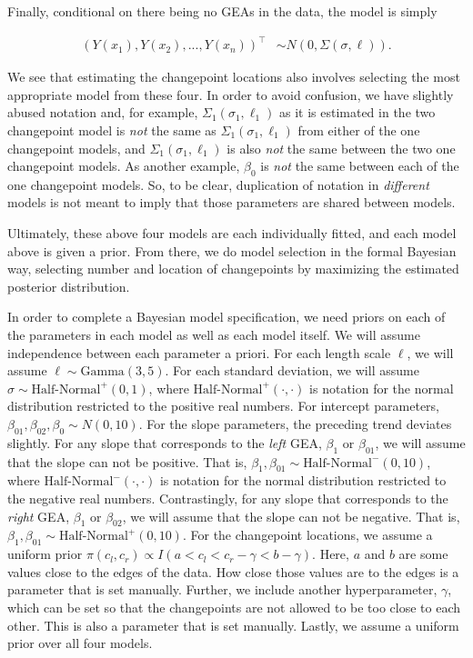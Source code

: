 \documentclass[12pt]{article}
\begin{document}
\noindent Finally, conditional on there being no GEAs in the data, the
model is simply

\begin{align}
(Y(x_{1}), Y(x_{2}), ..., Y(x_{n}))^{\top} &\sim N(0, \Sigma(\sigma, \ell)).
\end{align}

We see that estimating the changepoint locations also involves selecting
the most appropriate model from these four. In order to avoid confusion,
we have slightly abused notation and, for example,
\(\Sigma_1(\sigma_1, \ell_1)\) as it is estimated in the two changepoint
model is \emph{not} the same as \(\Sigma_1(\sigma_1, \ell_1)\) from
either of the one changepoint models, and \(\Sigma_1(\sigma_1, \ell_1)\)
is also \emph{not} the same between the two one changepoint models. As
another example, \(\beta_0\) is \emph{not} the same between each of the
one changepoint models. So, to be clear, duplication of notation in
\emph{different} models is not meant to imply that those parameters are
shared between models.

Ultimately, these above four models are each individually fitted, and
each model above is given a prior. From there, we do model selection in
the formal Bayesian way, selecting number and location of changepoints
by maximizing the estimated posterior distribution.

In order to complete a Bayesian model specification, we need priors on
each of the parameters in each model as well as each model itself. We
will assume independence between each parameter a priori. For each
length scale \(\ell\), we will assume \(\ell \sim \text{Gamma}(3,5)\).
For each standard deviation, we will assume
\(\sigma \sim \text{Half-Normal}^{+}(0,1)\), where
\(\text{Half-Normal}^{+}(\cdot,\cdot)\) is notation for the normal
distribution restricted to the positive real numbers. For intercept
parameters, \(\beta_{01}, \beta_{02}, \beta_0 \sim N(0, 10)\). For the
slope parameters, the preceding trend deviates slightly. For any slope
that corresponds to the \emph{left} GEA, \(\beta_1\) or \(\beta_{01}\),
we will assume that the slope can not be positive. That is,
\(\beta_1, \beta_{01} \sim \text{Half-Normal}^{-}(0,10)\), where
\(\text{Half-Normal}^{-}(\cdot, \cdot)\) is notation for the normal
distribution restricted to the negative real numbers. Contrastingly, for
any slope that corresponds to the \emph{right} GEA, \(\beta_1\) or
\(\beta_{02}\), we will assume that the slope can not be negative. That
is, \(\beta_1, \beta_{01} \sim \text{Half-Normal}^{+}(0,10)\). For the
changepoint locations, we assume a uniform prior
\(\pi(c_l, c_r) \propto I(a < c_l < c_r - \gamma < b - \gamma)\). Here,
\(a\) and \(b\) are some values close to the edges of the data. How
close those values are to the edges is a parameter that is set manually.
Further, we include another hyperparameter, \(\gamma\), which can be set
so that the changepoints are not allowed to be too close to each other.
This is also a parameter that is set manually. Lastly, we assume a
uniform prior over all four models.
\end{document}
